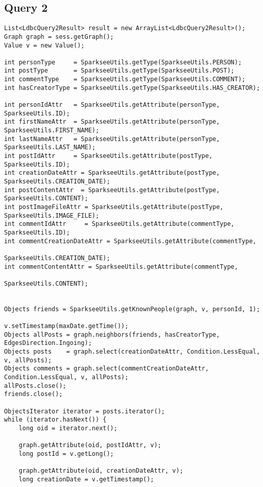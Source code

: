 \subsection{Query 2}
{\footnotesize
\begin{verbatim}
List<LdbcQuery2Result> result = new ArrayList<LdbcQuery2Result>();
Graph graph = sess.getGraph();
Value v = new Value();

int personType     = SparkseeUtils.getType(SparkseeUtils.PERSON);
int postType       = SparkseeUtils.getType(SparkseeUtils.POST);
int commentType    = SparkseeUtils.getType(SparkseeUtils.COMMENT);
int hasCreatorType = SparkseeUtils.getType(SparkseeUtils.HAS_CREATOR);

int personIdAttr   = SparkseeUtils.getAttribute(personType, SparkseeUtils.ID);
int firstNameAttr  = SparkseeUtils.getAttribute(personType, SparkseeUtils.FIRST_NAME);
int lastNameAttr   = SparkseeUtils.getAttribute(personType, SparkseeUtils.LAST_NAME);
int postIdAttr     = SparkseeUtils.getAttribute(postType, SparkseeUtils.ID);
int creationDateAttr = SparkseeUtils.getAttribute(postType, SparkseeUtils.CREATION_DATE);
int postContentAttr  = SparkseeUtils.getAttribute(postType, SparkseeUtils.CONTENT);
int postImageFileAttr = SparkseeUtils.getAttribute(postType, SparkseeUtils.IMAGE_FILE);
int commentIdAttr     = SparkseeUtils.getAttribute(commentType, SparkseeUtils.ID);
int commentCreationDateAttr = SparkseeUtils.getAttribute(commentType, 
                                                         SparkseeUtils.CREATION_DATE);
int commentContentAttr = SparkseeUtils.getAttribute(commentType, 
                                                    SparkseeUtils.CONTENT);


Objects friends = SparkseeUtils.getKnownPeople(graph, v, personId, 1);

v.setTimestamp(maxDate.getTime());
Objects allPosts = graph.neighbors(friends, hasCreatorType, EdgesDirection.Ingoing);
Objects posts    = graph.select(creationDateAttr, Condition.LessEqual, v, allPosts);
Objects comments = graph.select(commentCreationDateAttr, Condition.LessEqual, v, allPosts);
allPosts.close();
friends.close();

ObjectsIterator iterator = posts.iterator();
while (iterator.hasNext()) {
    long oid = iterator.next();

    graph.getAttribute(oid, postIdAttr, v);
    long postId = v.getLong();

    graph.getAttribute(oid, creationDateAttr, v);
    long creationDate = v.getTimestamp();


\end{verbatim}}
